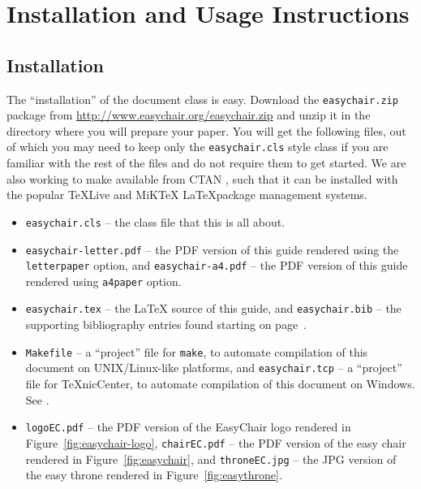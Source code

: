 \documentclass{easychair}
\newcommand{\easychair}{\sf{easychair}}
\newcommand{\miktex}{MiK{\TeX}}
\newcommand{\texniccenter}{{\TeX}nicCenter}
\newcommand{\makefile}{\texttt{Makefile}}
\begin{document}
\section{Installation and Usage Instructions}
\label{sect:installation-usage}

\subsection{Installation}

The ``installation'' of the {\easychair} document class is easy.
Download the \texttt{easychair.zip} package 
from \url{http://www.easychair.org/easychair.zip}
and unzip it in the directory where you will prepare your paper.
You will get the following files, out of which you may need to keep only 
the \texttt{easychair.cls} style class if you are familiar with the rest 
of the files and do not require them to get started.
We are also working to make {\easychair} available from CTAN \cite{ctan},
such that it can be installed with the popular \TeX Live \cite{texlive} and
{\miktex} \cite{miktex} \LaTeX package management systems.

\begin{itemize}
\item
\texttt{easychair.cls} -- the class file that this is all about.

\item
\texttt{easychair-letter.pdf} -- the PDF version of this guide rendered using 
the \texttt{letterpaper} option, 
and 
\texttt{easychair-a4.pdf} -- the PDF version of this guide rendered using 
\texttt{a4paper} option.

\item
\texttt{easychair.tex} -- the {\LaTeX} source of this guide, 
and
\texttt{easychair.bib} -- the supporting bibliography entries found starting 
on page~\pageref{sect:bib}.

\item
{\makefile} -- a ``project'' file for \texttt{make}, to automate compilation of 
this document on UNIX/Linux-like platforms,
and
\texttt{easychair.tcp} -- a ``project'' file for {\texniccenter}, to automate
compilation of this document on Windows. 
See .

\item
\texttt{logoEC.pdf} -- the PDF version of the EasyChair logo rendered in
Figure~\ref{fig:easychair-logo},
\texttt{chairEC.pdf} -- the PDF version of the easy chair rendered in 
Figure~\ref{fig:easychair},
and
\texttt{throneEC.jpg} -- the JPG version of the easy throne rendered in 
Figure~\ref{fig:easythrone}.

\end{itemize}
\end{document}
